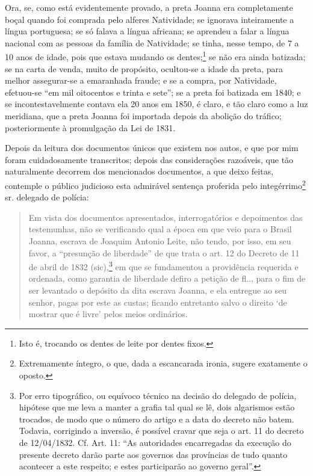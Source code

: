 {Ora, se, como está evidentemente provado, a preta Joanna era
completamente boçal quando foi comprada pelo alferes Natividade; se
ignorava inteiramente a língua portuguesa; se só falava a língua
africana; se aprendeu a falar a língua nacional com as pessoas da
família de Natividade; se tinha, nesse tempo, de 7 a 10 anos de idade,
pois que estava mudando os dentes;\footnote{ Isto é, trocando os dentes
  de leite por dentes fixos.} se não era ainda batizada; se na carta de
venda, muito de propósito, ocultou-se a idade da preta, para melhor
assegurar-se a emaranhada fraude; e se a compra, por Natividade,
efetuou-se ``em mil oitocentos e trinta e sete''; se a preta foi batizada
em 1840; e se incontestavelmente contava ela 20 anos em 1850, é claro, e
tão claro como a luz meridiana, que a preta Joanna foi importada depois
da abolição do tráfico; posteriormente à promulgação da Lei de 1831.

Depois da leitura dos documentos únicos que existem nos autos, e que por
mim foram cuidadosamente transcritos; depois das considerações
razoáveis, que tão naturalmente decorrem dos mencionados documentos, a
que deixo feitas, contemple o público judicioso esta admirável sentença
proferida pelo integérrimo\footnote{ Extremamente íntegro, o que, dada
  a escancarada ironia, sugere exatamente o oposto.} sr. delegado de
polícia:

\begin{quote}
Em vista dos documentos apresentados, interrogatórios e depoimentos das
testemunhas, não se verificando qual a época em que veio para o Brasil
Joanna, escrava de Joaquim Antonio Leite, não tendo, por isso, em seu
favor, a ``presunção de liberdade'' de que trata o art. 12 do Decreto de
11 de abril de 1832 (sic),\footnote{ Por erro tipográfico, ou equívoco
  técnico na decisão do delegado de polícia, hipótese que me leva a
  manter a grafia tal qual se lê, dois algarismos estão trocados, de
  modo que o número do artigo e a data do decreto não batem. Todavia,
  corrigindo a inversão, é possível cravar que seja o art. 11 do decreto
  de 12/04/1832. Cf. Art. 11: ``As autoridades encarregadas da execução
  do presente decreto darão parte aos governos das províncias de tudo
  quanto acontecer a este respeito; e estes participarão ao governo
  geral''.} em que se fundamentou a providência requerida e ordenada,
como garantia de liberdade defiro a petição de fl.., para o fim de ser
levantado o depósito da dita escrava Joanna, e ela entregue ao seu
senhor, pagas por este as custas; ficando entretanto salvo o direito `de
mostrar que é livre' pelos meios ordinários.


\end{quote}}
